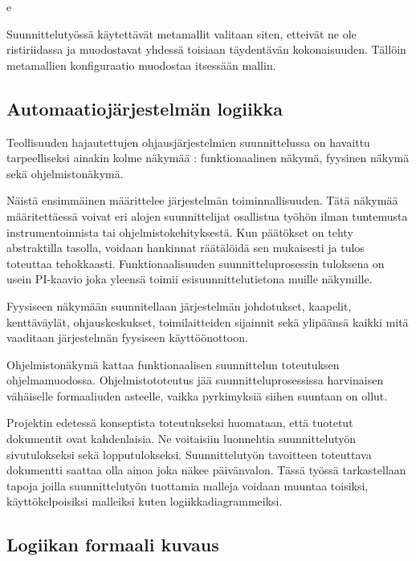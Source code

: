 e	\documentclass[finnish,12pt]{article}
\begin{document}
Suunnittelutyössä käytettävät metamallit valitaan siten, etteivät ne ole
ristiriidassa ja muodostavat yhdessä toisiaan täydentävän kokonaisuuden. Tällöin
metamallien konfiguraatio muodostaa itsessään mallin.

	\subsection{Automaatiojärjestelmän logiikka}

Teollisuuden hajautettujen ohjausjärjestelmien suunnittelussa on havaittu
tarpeelliseksi ainakin kolme näkymää \cite{RefWorks:38}: funktionaalinen näkymä,
fyysinen näkymä sekä ohjelmistonäkymä.

Näistä ensimmäinen määrittelee järjestelmän toiminnallisuuden. Tätä näkymää
määritettäessä voivat eri alojen suunnittelijat osallistua työhön ilman
tuntemusta instrumentoinnista tai ohjelmistokehityksestä. Kun päätökset on tehty
abstraktilla tasolla, voidaan hankinnat räätälöidä sen mukaisesti ja tulos
toteuttaa tehokkaasti. Funktionaalisuuden suunnitteluprosessin tuloksena on usein
PI-kaavio joka yleensä toimii esisuunnittelutietona muille näkymille.

Fyysiseen näkymään suunnitellaan järjestelmän johdotukset, kaapelit, kenttäväylät,
ohjauskeskukset, toimilaitteiden sijainnit sekä ylipäänsä kaikki mitä vaaditaan 
järjestelmän fyysiseen käyttöönottoon.

Ohjelmistonäkymä kattaa funktionaalisen suunnittelun toteutuksen ohjelmamuodossa.
Ohjelmistototeutus jää suunnitteluprosessissa harvinaisen vähäiselle formaaliuden asteelle,
vaikka pyrkimyksiä siihen suuntaan on ollut.

Projektin edetessä konseptista toteutukseksi huomataan, että tuotetut dokumentit ovat kahdenlaisia.
Ne voitaisiin luonnehtia suunnittelutyön sivutulokseksi sekä lopputulokseksi.
Suunnittelutyön tavoitteen toteuttava dokumentti saattaa olla ainoa joka näkee päivänvalon.
Tässä työssä tarkastellaan tapoja joilla suunnittelutyön tuottamia malleja voidaan muuntaa
toisiksi, käyttökelpoisiksi malleiksi kuten logiikkadiagrammeiksi.

	\subsection{Logiikan formaali kuvaus}
\end{document}

